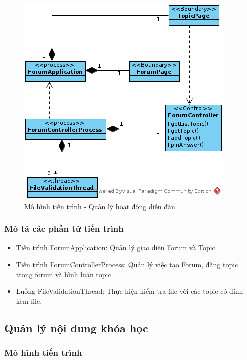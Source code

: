 \documentclass[./../main.tex]{subfiles}
\begin{document}
\begin{figure}[H]
	\centering
	\includegraphics[width=\linewidth]{./images/pv_manage_forum.png}
\caption{Mô hình tiến trình - Quản lý hoạt động diễn đàn}

\end{figure}

\subsubsection{Mô tả các phần tử tiến trình}
\begin{itemize}
	\item Tiến trình ForumApplication: Quản lý giao diện Forum và Topic.
	\item Tiến trình ForumControllerProcess: Quản lý việc tạo Forum, đăng topic trong forum và bình luận topic.
	\item Luồng FileValidationThread: Thực hiện kiểm tra file với các topic có đính kèm file.
\end{itemize}

\subsection{Quản lý nội dung khóa học}

\subsubsection{Mô hình tiến trình}
\end{document}

